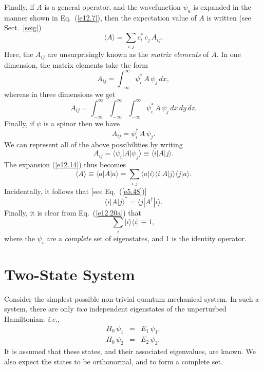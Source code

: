 Finally, if $A$ is a general operator, and the wavefunction
$\psi_a$ is expanded in the manner shown in Eq.~(\ref{e12.7}), then the expectation value of
$A$ is written (see Sect.~\ref{seig})
\begin{equation}\label{e12.14}
\langle A\rangle = \sum_{i,j} c_i^\ast\,c_j\,A_{ij}.
\end{equation}
Here, the $A_{ij}$ are unsurprisingly known as the {\em matrix
elements}\/ of $A$.
In one dimension, the matrix elements take the form
\begin{equation}
A_{ij} = \int_{-\infty}^\infty\psi_i^\ast\,A\,\psi_j\,dx,
\end{equation}
whereas in three dimensions we get
\begin{equation}
A_{ij} = \int_{-\infty}^\infty\int_{-\infty}^\infty\int_{-\infty}^\infty\psi_i^\ast\,A\,\psi_j\,dx\,dy\,dz.
\end{equation}
Finally, if $\psi$ is a spinor then we have
\begin{equation}
A_{ij}=\psi_i^\dag\,A\,\psi_j.
\end{equation}
We can represent all of the above possibilities by
writing
\begin{equation}
A_{ij}=\langle \psi_i|A|\psi_j\rangle \equiv \langle i|A|j\rangle.
\end{equation}
The expansion (\ref{e12.14}) thus becomes
\begin{equation}\label{e12.20a}
\langle A\rangle \equiv\langle a|A|a\rangle= \sum_{i,j} \langle a|i\rangle
\langle i|A|j\rangle \langle j|a\rangle.
\end{equation}
Incidentally, it follows that [see Eq.~(\ref{e5.48})]
\begin{equation}
 \langle i|A|j\rangle^\ast=\langle j| A^\dag|i\rangle.
\end{equation}
Finally, it is clear from Eq.~(\ref{e12.20a}) that
\begin{equation}\label{e12.20}
\sum_{i} |i\rangle \langle i| \equiv 1,
\end{equation}
where the $\psi_i$ are a {\em complete}\/ set of eigenstates, and 1 is the
identity operator.

\section{Two-State System}
Consider the simplest possible non-trivial quantum mechanical system.
In such a system,
there are only {\em two}\/ independent eigenstates
of the unperturbed Hamiltonian: {\em i.e.},
\begin{eqnarray}\label{e12.21}
H_0\,\psi_1 &=& E_1\,\psi_1,\\[0.5ex]
H_0\,\psi_2&=&E_2\,\psi_2.\label{e12.22}
\end{eqnarray}
It is assumed that these states, and their associated eigenvalues, are known.
We also expect the states to be orthonormal, and to form a complete set.

